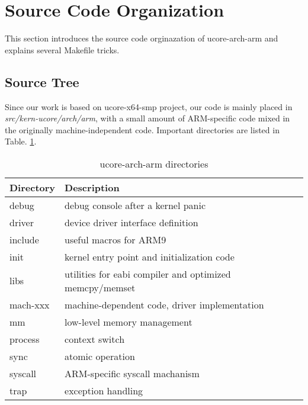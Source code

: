 \documentclass[a4paper]{article}
\begin{document}
\section{Source Code Organization}
This section introduces the source code orginazation of ucore-arch-arm 
and explains several Makefile tricks.
\subsection{Source Tree}
Since our work is based on ucore-x64-smp project, our code is mainly placed
in \emph{src/kern-ucore/arch/arm}, with a small amount of ARM-specific 
code mixed in the originally machine-independent code. Important directories are listed in Table. \ref{tab:dir}.

\begin{table}[h]
  \centering
  \begin{tabular}{|l|l|}
    \hline
    Directory & Description \\
    \hline
    debug  &     debug console after a kernel panic \\
    driver &     device driver interface definition \\
    include &    useful macros for ARM9              \\
    init   &     kernel entry point and initialization code \\
    libs   &     utilities for eabi compiler and optimized memcpy/memset \\
    mach-xxx &   machine-dependent code, driver implementation \\
    mm     &     low-level memory management \\
    process   &  context switch             \\
    sync   &     atomic operation           \\
    syscall &     ARM-specific syscall machanism \\
    trap   &     exception handling  \\
    \hline
  \end{tabular}
  \caption{ucore-arch-arm directories}
  \label{tab:dir}
\end{table}
\end{document}
